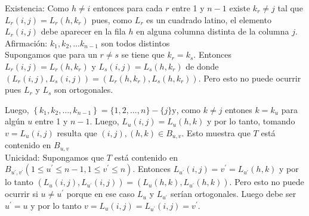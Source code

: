 \documentclass[10pt]{article}
\begin{document}
Existencia: Como $h \neq i$ entonces para cada $r$ entre 1 y $n-1$ existe $k_{r} \neq j$ tal que $L_{r}(i, j)=L_{r}\left(h, k_{r}\right)$ pues, como $L_{r}$ es un cuadrado latino, el elemento $L_{r}(i, j)$ debe aparecer en la fila $h$ en alguna columna distinta de la columna $j$.\\
Afirmación: $k_{1}, k_{2}, \ldots k_{n-1}$ son todos distintos\\
Supongamos que para un $r \neq s$ se tiene que $k_{r}=k_{s}$. Entonces $L_{r}(i, j)=L_{r}\left(h, k_{r}\right)$ y $L_{s}(i, j)=L_{s}\left(h, k_{r}\right)$ de donde $\left(L_{r}(i, j), L_{s}(i, j)\right)=\left(L_{r}\left(h, k_{r}\right), L_{s}\left(h, k_{r}\right)\right)$. Pero esto no puede ocurrir pues $L_{r}$ y $L_{s}$ son ortogonales.

Luego, $\left\{k_{1}, k_{2}, \ldots, k_{n-1}\right\}=\{1,2, \ldots, n\}-\{j\} \mathrm{y}$, como $k \neq j$ entones $k=k_{u}$ para algún $u$ entre 1 y $n-1$. Luego, $L_{u}(i, j)=L_{u}(h, k)$ y por lo tanto, tomando $v=L_{u}(i, j)$ resulta que $(i, j),(h, k) \in B_{u, v}$. Esto muestra que $T$ está contenido en $B_{u, v}$\\
Unicidad: Supongamos que $T$ está contenido en $B_{u^{\prime}, v^{\prime}}\left(1 \leq u^{\prime} \leq n-1,1 \leq v^{\prime} \leq n\right)$. Entonces $L_{u^{\prime}}(i, j)=v^{\prime}=L_{u^{\prime}}(h, k)$ y por lo tanto $\left(L_{u}(i, j), L_{u^{\prime}}(i, j)\right)=\left(L_{u}(h, k), L_{u^{\prime}}(h, k)\right)$. Pero esto no puede ocurrir si $u \neq u^{\prime}$ porque en ese caso $L_{u}$ y $L_{u^{\prime}}$ serían ortogonales. Luego debe ser $u^{\prime}=u$ y por lo tanto $v=L_{u}(i, j)=L_{u^{\prime}}(i, j)=v^{\prime}$.
\end{document}
